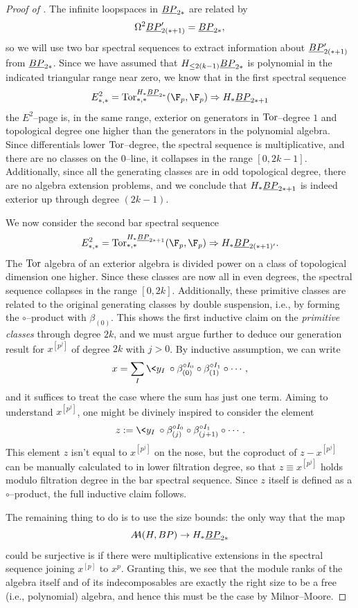 \begin{proof}[{Proof of }]
The infinite loopspaces in \(\OS{BP}{2*}\) are related by \[\Loops^2 \OS{BP}{2(*+1)}' = \OS{BP}{2*},\] so we will use two bar spectral sequences to extract information about \(\OS{BP}{2(*+1)}'\) from \(\OS{BP}{2*}\).
Since we have assumed that \(H_{\le 2(k-1)} \OS{BP}{2*}\) is polynomial in the indicated triangular range near zero, we know that in the first spectral sequence \[E^2_{*, *} = \Tor^{H_* \OS{BP}{2*}}_{*, *}(\F_p, \F_p) \Rightarrow H_* \OS{BP}{2*+1}\] the \(E^2\)--page is, in the same range, exterior on generators in \(\operatorname{Tor}\)--degree \(1\) and topological degree one higher than the generators in the polynomial algebra.
Since differentials lower \(\operatorname{Tor}\)--degree, the spectral sequence is multiplicative, and there are no classes on the \(0\)--line, it collapses in the range \([0, 2k-1]\).
Additionally, since all the generating classes are in odd topological degree, there are no algebra extension problems, and we conclude that \(H_* \OS{BP}{2*+1}\) is indeed exterior up through degree \((2k-1)\).

We now consider the second bar spectral sequence \[E^2_{*, *} = \Tor^{H_* \OS{BP}{2*+1}}_{*, *}(\F_p, \F_p) \Rightarrow H_* \OS{BP}{2(*+1)'}.\]
The \(\operatorname{Tor}\) algebra of an exterior algebra is divided power on a class of topological dimension one higher.
Since these classes are now all in even degrees, the spectral sequence collapses in the range \([0, 2k]\).
Additionally, these primitive classes are related to the original generating classes by double suspension, i.e., by forming the \(\circ\)--product with \(\beta_{(0)}\).
This shows the first inductive claim on the \emph{primitive classes} through degree \(2k\), and we must argue further to deduce our generation result for \(x^{[p^j]}\) of degree \(2k\) with \(j > 0\).
By inductive assumption, we can write \[x = \sum_I \<y_I\> \circ \beta_{(0)}^{\circ I_0} \circ \beta_{(1)}^{\circ I_1} \circ \cdots,\] and it suffices to treat the case where the sum has just one term.
Aiming to understand \(x^{[p^j]}\), one might be divinely inspired to consider the element \[z := \<y_I\> \circ \beta_{(j)}^{\circ I_0} \circ \beta_{(j+1)}^{\circ I_1} \circ \cdots.\]
This element \(z\) isn't equal to \(x^{[p^j]}\) on the nose, but the coproduct of \(z - x^{[p^j]}\) can be manually calculated to in lower filtration degree, so that \(z \equiv x^{[p^j]}\) holds modulo filtration degree in the bar spectral sequence.
Since \(z\) itself is defined as a \(\circ\)--product, the full inductive claim follows.

The remaining thing to do is to use the size bounds: the only way that the map \[\AA(H, BP) \to H_* \OS{BP}{2*}\] could be surjective is if there were multiplicative extensions in the spectral sequence joining \(x^{[p]}\) to \(x^p\).
Granting this, we see that the module ranks of the algebra itself and of its indecomposables are exactly the right size to be a free (i.e., polynomial) algebra, and hence this must be the case by Milnor--Moore.
\end{proof}

